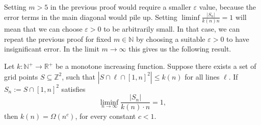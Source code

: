 \documentclass[11pt,a4paper]{article}
\numberwithin{equation}{section}
\newcommand{\nn}{\mathbb{N}}
\newcommand{\zz}{\mathbb{Z}}
\begin{document}
Setting $m>5$ in the previous proof would require a smaller $\varepsilon$ value, because the error terms in the main diagonal would pile up. Setting $\liminf\frac{|S_n|}{k(n) n}=1$ will mean that we can choose $\varepsilon>0$ to be arbitrarily small. In that case, we can repeat the previous proof for fixed $m\in \nn$ by choosing a suitable $\varepsilon>0$ to have insignificant error. In the limit $m\to\infty$ this gives us the following result.

\begin{theorem}
Let $k:\nn^+\to\mathbb{R}^+$ be a monotone increasing function. Suppose there exists a set of grid points $S\subseteq\zz^{2}$, such that $\left|S\cap\ell\cap[1,n]^{2}\right|\le k(n)$ for all lines $\ell$. If $S_n:=S\cap [1,n]^2$ satisfies
$$\liminf_{n\to\infty} \frac{|S_n|}{k(n)\cdot n} = 1,$$
then $k(n) = \Omega( n^c)$, for every constant $c<1$.
\end{theorem}
\end{document}
